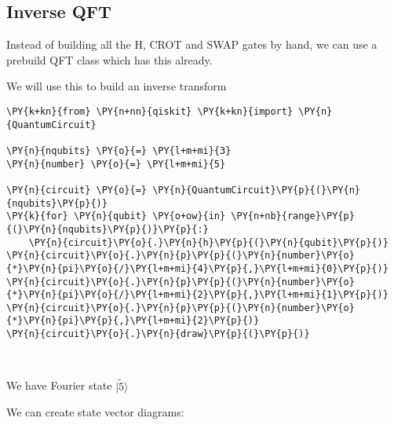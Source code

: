     \hypertarget{inverse-qft}{%
\subsection{Inverse QFT}\label{inverse-qft}}

Instead of building all the H, CROT and SWAP gates by hand, we can use a
prebuild QFT class which has this already.

We will use this to build an inverse transform

    \begin{tcolorbox}[breakable, size=fbox, boxrule=1pt, pad at break*=1mm,colback=cellbackground, colframe=cellborder]
\begin{Verbatim}[commandchars=\\\{\}]
\PY{k+kn}{from} \PY{n+nn}{qiskit} \PY{k+kn}{import} \PY{n}{QuantumCircuit}

\PY{n}{nqubits} \PY{o}{=} \PY{l+m+mi}{3}
\PY{n}{number} \PY{o}{=} \PY{l+m+mi}{5}

\PY{n}{circuit} \PY{o}{=} \PY{n}{QuantumCircuit}\PY{p}{(}\PY{n}{nqubits}\PY{p}{)}
\PY{k}{for} \PY{n}{qubit} \PY{o+ow}{in} \PY{n+nb}{range}\PY{p}{(}\PY{n}{nqubits}\PY{p}{)}\PY{p}{:}
    \PY{n}{circuit}\PY{o}{.}\PY{n}{h}\PY{p}{(}\PY{n}{qubit}\PY{p}{)}
\PY{n}{circuit}\PY{o}{.}\PY{n}{p}\PY{p}{(}\PY{n}{number}\PY{o}{*}\PY{n}{pi}\PY{o}{/}\PY{l+m+mi}{4}\PY{p}{,}\PY{l+m+mi}{0}\PY{p}{)}
\PY{n}{circuit}\PY{o}{.}\PY{n}{p}\PY{p}{(}\PY{n}{number}\PY{o}{*}\PY{n}{pi}\PY{o}{/}\PY{l+m+mi}{2}\PY{p}{,}\PY{l+m+mi}{1}\PY{p}{)}
\PY{n}{circuit}\PY{o}{.}\PY{n}{p}\PY{p}{(}\PY{n}{number}\PY{o}{*}\PY{n}{pi}\PY{p}{,}\PY{l+m+mi}{2}\PY{p}{)}
\PY{n}{circuit}\PY{o}{.}\PY{n}{draw}\PY{p}{(}\PY{p}{)}
\end{Verbatim}
\end{tcolorbox}
 
            
    
    \begin{center}
    \end{center}
    { \hspace*{\fill} \\}
    

    We have Fourier state \(|\tilde{5} \rangle\)

We can create state vector diagrams:

